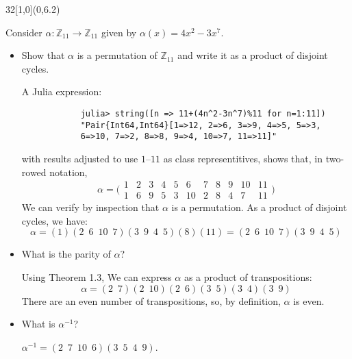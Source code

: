 \documentclass[12pt]{article}
\newcommand{\zee}{\mathbb{Z}}
\newenvironment{exercise}[2]{\begin{textblock}{32}[1,0](0,#2)\noindent#1\end{textblock}}{\vspace{1in}}
\begin{document}
\begin{exercise}{1.29}{6.2}
	{\noindent}Consider $\alpha: \zee_{11}\to \zee_{11}$ given by $\alpha(x)=4x^2-3x^7$.
	\begin{itemize}
		\item Show that $\alpha$ is a permutation of $\zee_{11}$ and write it as a product of disjoint cycles.
		\bigskip

		A Julia expression:
		\begin{verbatim}
			julia> string([n => 11+(4n^2-3n^7)%11 for n=1:11])
			"Pair{Int64,Int64}[1=>12, 2=>6, 3=>9, 4=>5, 5=>3,
			6=>10, 7=>2, 8=>8, 9=>4, 10=>7, 11=>11]"
		\end{verbatim}
		with results adjusted to use $1$--$11$ as class representitives, shows that, in two-rowed notation,
		\[
		\alpha = \bigl(
			\begin{array}{rrrrrrrrrrr}
		    1 &  2 &  3 &  4 &  5 &  6 &  7 &  8 &  9 & 10 & 11 \\
		    1 &  6 &  9 &  5 &  3 & 10 &  2 &  8 &  4 &  7 & 11
		  \end{array}
			\bigr)
		\]
		We can verify by inspection that $\alpha$ is a permutation. As a product of disjoint cycles, we have:
		\[ \alpha = (1)(2\enspace6\enspace10\enspace7)(3\enspace9\enspace4\enspace5)(8)(11) = (2\enspace6\enspace10\enspace7)(3\enspace9\enspace4\enspace5) \]

		\item What is the parity of $\alpha$?
		\bigskip

		Using Theorem 1.3, We can express $\alpha$ as a product of transpositions:
		\[ \alpha = (2\enspace7)(2\enspace10)(2\enspace6)(3\enspace5)(3\enspace4)(3\enspace9) \]
		There are an even number of transpositions, so, by definition, $\alpha$ is even.

		\item What is $\alpha^{-1}$?
		\bigskip

		$\alpha^{-1}=(2\enspace7\enspace10\enspace6)(3\enspace5\enspace4\enspace9)$.
	\end{itemize}
\end{exercise}

\newpage
\end{document}
